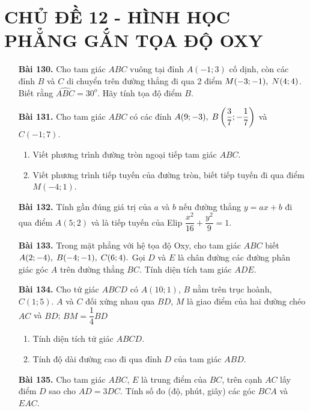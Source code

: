 \documentclass[12pt,a4paper]{article}
\begin{document}
\section*{CHỦ ĐỀ 12 - HÌNH HỌC PHẲNG GẮN TỌA ĐỘ OXY}
\begin{enumerate}
    \item[\textbf{Bài 130.}] Cho tam giác $ABC$ vuông tại đỉnh $A(-1;3)$ cố dịnh, còn các đỉnh $B$ và $C$ di chuyển trên đường thẳng đi qua 2 điểm $M(-3;-1),\thickspace N(4;4)$. Biết rằng $\widehat{ABC} = 30^o$. Hãy tính tọa độ điểm $B$.
    \item[\textbf{Bài 131.}] Cho tam giác $ABC$ có các đỉnh $A(9;-3),\thickspace B\left(\dfrac{3}{7};-\dfrac{1}{7}\right)$ và $C(-1;7)$.
        \begin{enumerate}
            \item Viết phương trình đường tròn ngoại tiếp tam giác $ABC$.
            \item Viết phương trình tiếp tuyến của đường tròn, biết tiếp tuyến đi qua điểm $M(-4;1)$.
        \end{enumerate}
    \item[\textbf{Bài 132.}] Tính gần đúng giá trị của $a$ và $b$ nếu đường thẳng $y=ax+b$ đi qua điểm $A(5;2)$ và là tiếp tuyến của Elip $\dfrac{x^2}{16} + \dfrac{y^2}{9} = 1$.
    \item[\textbf{Bài 133.}] Trong mặt phẳng với hệ tọa độ Oxy, cho tam giác $ABC$ biết $A(2;-4),\thickspace B(-4;-1),\thickspace C(6;4).$ Gọi $D$ và $E$ là chân đường các đường phân giác góc $A$ trên đường thẳng $BC$. Tính diện tích tam giác $ADE$.
    \item[\textbf{Bài 134.}] Cho tứ giác $ABCD$ có $A(10;1)$, $B$ nằm trên trục hoành, $C(1;5)$. $A$ và $C$ đối xứng nhau qua $BD$, $M$ là giao điểm của hai đường chéo $AC$ và $BD$; $BM=\dfrac{1}{4}BD$
        \begin{enumerate}
            \item Tính diện tích tứ giác $ABCD$.
            \item Tính độ dài đường cao đi qua đỉnh $D$ của tam giác $ABD$.
        \end{enumerate}
    \item[\textbf{Bài 135.}] Cho tam giác $ABC$, $E$ là trung điểm của $BC$, trên cạnh $AC$ lấy điểm $D$ sao cho $AD=3DC$. Tính số đo (độ, phút, giây) các góc $BCA$ và $EAC$.
\end{enumerate}
\end{document}
